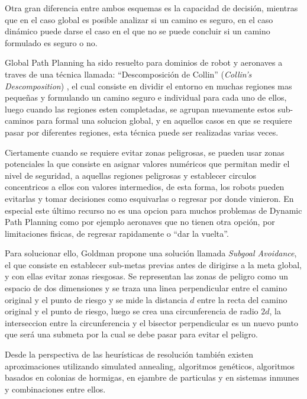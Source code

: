Otra gran diferencia entre ambos esquemas es la capacidad de decisi\'on, mientras que en el caso global es posible analizar si un camino es seguro, en el caso din\'amico puede darse el caso en el que no se puede concluir si un camino formulado es seguro o no. \cite{Goldman94}

Global Path Planning ha sido resuelto para dominios de robot y aeronaves a traves de una t\'ecnica llamada: ``Descomposici\'on de Collin'' (\textit{Collin's Descomposition}) \cite{Latombe91}, el cual consiste en dividir el entorno en muchas regiones mas peque\~nas y formulando un camino seguro e individual para cada uno de ellos, luego cuando las regiones esten completadas, se agrupan nuevamente estos sub-caminos para formal una solucion global, y en aquellos casos en que se requiere pasar por diferentes regiones, esta t\'ecnica puede ser realizadas varias veces.\cite{Goldman94}

Ciertamente cuando se requiere evitar zonas peligrosas, se pueden usar zonas potenciales la que consiste en asignar valores num\'ericos que permitan medir el nivel de seguridad, a aquellas regiones peligrosas y establecer circulos concentricos a ellos con valores intermedios, de esta forma, los robots pueden evitarlas y tomar decisiones como esquivarlas o regresar por donde vinieron. En especial este \'ultimo recurso no es una opcion para muchos problemas de Dynamic Path Planning como por ejemplo aeronaves que no tienen otra opci\'on, por limitaciones fisicas, de regresar rapidamente o ``dar la vuelta''.

Para solucionar ello, Goldman propone una soluci\'on llamada \textit{Subgoal Avoidance}, el que consiste en establecer sub-metas previas antes de dirigirse a la meta global, y con ellas evitar zonas riesgosas. Se representan las zonas de peligro como un espacio de dos dimensiones y se traza una linea perpendicular entre el camino original y el punto de riesgo y se mide la distancia $d$ entre la recta del camino original y el punto de riesgo, luego se crea una circunferencia de radio $2d$, la interseccion entre la circunferencia y el bisector perpendicular es un nuevo punto que ser\'a una submeta por la cual se debe pasar para evitar el peligro.\cite{Goldman94}


Desde la perspectiva de las heur\'isticas de resoluci\'on tambi\'en existen aproximaciones utilizando simulated annealing, algoritmos gen\'eticos, algoritmos basados en colonias de hormigas, en ejambre de particulas y en sistemas inmunes y combinaciones entre ellos.

